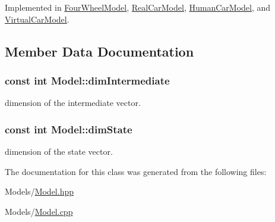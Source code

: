 Implemented in \hyperlink{classFourWheelModel_a2169e82abcb344e4bb345c563e6ea7de}{Four\+Wheel\+Model}, \hyperlink{classRealCarModel_a4437d9515709862a19fdd5f7e828d757}{Real\+Car\+Model}, \hyperlink{classHumanCarModel_aeaa782fab7b9ea5d9b245df0ced2b7cb}{Human\+Car\+Model}, and \hyperlink{classVirtualCarModel_ab7a61fe2ce2180bd330dbf2819249457}{Virtual\+Car\+Model}.



\subsection{Member Data Documentation}
\subsubsection[{\texorpdfstring{dim\+Intermediate}{dimIntermediate}}]{\setlength{\rightskip}{0pt plus 5cm}const int Model\+::dim\+Intermediate\hspace{0.3cm}{\ttfamily [protected]}}\hypertarget{classModel_a0fd04d08ff3bdafdaf747713ffc824f0}{}\label{classModel_a0fd04d08ff3bdafdaf747713ffc824f0}
dimension of the intermediate vector. 
\subsubsection[{\texorpdfstring{dim\+State}{dimState}}]{\setlength{\rightskip}{0pt plus 5cm}const int Model\+::dim\+State\hspace{0.3cm}{\ttfamily [protected]}}\hypertarget{classModel_a863cbb90f0192bfdaced9d15c6757890}{}\label{classModel_a863cbb90f0192bfdaced9d15c6757890}
dimension of the state vector. 

The documentation for this class was generated from the following files\+:\begin{DoxyCompactItemize}
\item 
Models/\hyperlink{Model_8hpp}{Model.\+hpp}\item 
Models/\hyperlink{Model_8cpp}{Model.\+cpp}\end{DoxyCompactItemize}
